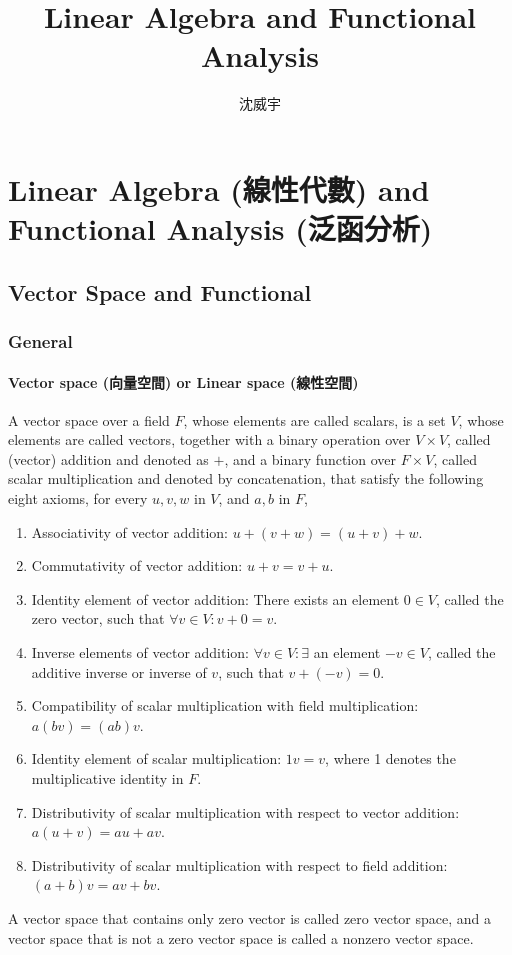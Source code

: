 \documentclass[a4paper,12pt]{report}
\begin{document}
\title{Linear Algebra and Functional Analysis}
\author{沈威宇}
\date{\temtoday}
\titletocdoc
\chapter{Linear Algebra (線性代數) and Functional Analysis (泛函分析)}
\section{Vector Space and Functional}
\subsection{General}
\subsubsection{Vector space (向量空間) or Linear space (線性空間)}
A vector space over a field $F$, whose elements are called scalars, is a set $V$, whose elements are called vectors, together with a binary operation over $V\times V$, called (vector) addition and denoted as $+$, and a binary function over $F\times V$, called scalar multiplication and denoted by concatenation, that satisfy the following eight axioms, for every $u,v,w$ in $V$, and $a,b$ in $F$,
\begin{enumerate}
\item Associativity of vector addition: $u + (v + w) = (u + v) + w$.
\item Commutativity of vector addition: $u + v = v + u$.
\item Identity element of vector addition: There exists an element $ 0 \in V$, called the zero vector, such that $\forall v\in V\colon v+ 0=v$.
\item Inverse elements of vector addition: $\forall v\in V\colon \exists$ an element $-v\in V$, called the additive inverse or inverse of $v$, such that $v + (−v) = 0$.
\item Compatibility of scalar multiplication with field multiplication: $a(bv) = (ab)v$.
\item Identity element of scalar multiplication: $1v = v$, where 1 denotes the multiplicative identity in $F$.
\item Distributivity of scalar multiplication with respect to vector addition: $a(u + v) = au + av$.
\item Distributivity of scalar multiplication with respect to field addition: $(a + b)v = av + bv$.
\end{enumerate}
A vector space that contains only zero vector is called zero vector space, and a vector space that is not a zero vector space is called a nonzero vector space.
\end{document}
